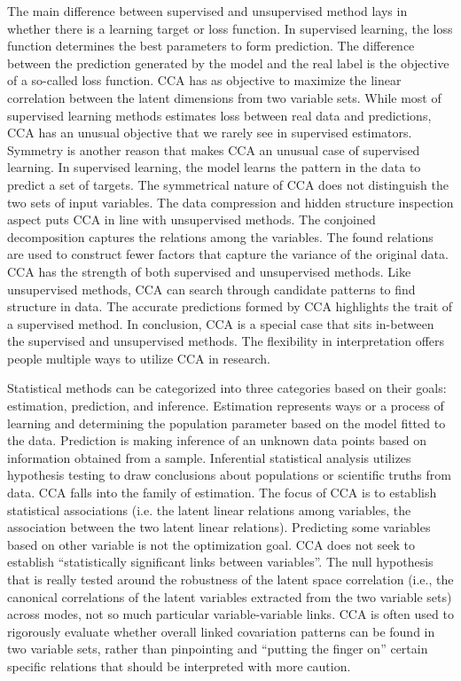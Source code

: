 The main difference between supervised and unsupervised method lays in whether there is a learning target or loss function. In supervised learning, the loss function determines the best parameters to form prediction. The difference between the prediction generated by the model and the real label is the objective of a so-called loss function. CCA has as objective to maximize the linear correlation between the latent dimensions from two variable sets. While most of supervised learning methods estimates loss between real data and predictions, CCA has an unusual objective that we rarely see in supervised estimators.  Symmetry is another reason that makes CCA an unusual case of supervised learning. In supervised learning, the model learns the pattern in the data to predict a set of targets. The symmetrical nature of CCA does not distinguish the two sets of input variables. The data compression and hidden structure inspection aspect puts CCA in line with unsupervised methods. The conjoined decomposition captures the relations among the variables. The found relations are used to construct fewer factors that capture the variance of the original data. CCA has the strength of both supervised and unsupervised methods. Like unsupervised methods, CCA can search through candidate patterns to find structure in data. The accurate predictions formed by CCA highlights the trait of a supervised method. In conclusion, CCA is a special case that sits in-between the supervised and unsupervised methods. The flexibility in interpretation offers people multiple ways to utilize CCA in research.

Statistical methods can be categorized into three categories based on their goals: estimation, prediction, and inference.  Estimation represents ways or a process of learning and determining the population parameter based on the model fitted to the data. Prediction is making inference of an unknown data points based on information obtained from a sample. Inferential statistical analysis utilizes hypothesis testing to draw conclusions about populations or scientific truths from data. CCA falls into the family of estimation. The focus of CCA is to establish statistical associations (i.e. the latent linear relations among variables, the association between the two latent linear relations). Predicting some variables based on other variable is not the optimization goal. CCA does not seek to establish “statistically significant links between variables”. The null hypothesis that is really tested around the robustness of the latent space correlation (i.e., the canonical correlations of the latent variables extracted from the two variable sets) across modes, not so much particular variable-variable links. CCA is often used to rigorously evaluate whether overall linked covariation patterns can be found in two variable sets, rather than pinpointing and “putting the finger on” certain specific relations that should be interpreted with more caution.


